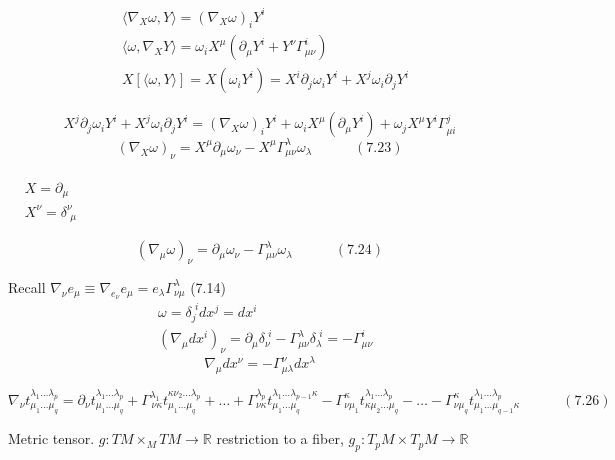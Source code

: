 \documentclass[twoside]{amsart}
\begin{document}
\[
\begin{aligned}
  & \langle \nabla_X \omega, Y \rangle = (\nabla_X \omega)_i Y^i \\ 
  & \langle \omega, \nabla_X Y \rangle = \omega_i X^{\mu} ( \partial_{\mu} Y^i + Y^{\nu} \Gamma^i_{\mu \nu } ) \\
  & X[ \langle \omega , Y \rangle ] = X(\omega_i Y^i ) = X^i \partial_j \omega_i Y^i + X^j \omega_i \partial_j Y^i 
\end{aligned}
\]

\[
X^j \partial_j \omega_i Y^i + X^j \omega_i \partial_j Y^i = (\nabla_X \omega)_i Y^i + \omega_i X^{\mu} ( \partial_{\mu} Y^i ) + \omega_j X^{\mu} Y^i \Gamma^j_{ \mu i }
\]
\[
(\nabla_X \omega)_{\nu} = X^{\mu} \partial_{\mu} \omega_{\nu} - X^{\mu} \Gamma^{\lambda}_{ \mu \nu} \omega_{\lambda} \quad \quad \quad (7.23)
\]

$\begin{aligned} & \quad \\ & X = \partial_{\mu} \\ & X^{\nu} = \delta^{\nu}_{ \, \, \mu } \end{aligned}$  

\[
(\nabla_{\mu} \omega)_{\nu} = \partial_{\mu} \omega_{\nu} - \Gamma_{\mu \nu}^{ \lambda}\omega_{\lambda} \quad \quad \quad (7.24)
\]

Recall $\nabla_{\nu} e_{\mu} \equiv \nabla_{e_{\nu}} e_{\mu} = e_{\lambda} \Gamma^{\lambda}_{\nu \mu} $ \quad \quad (7.14)
\[
\begin{aligned}
  & \omega = \delta_j^{ \, \, i } dx^j = dx^i \\ 
  & (\nabla_{\mu} dx^i )_{\nu} = \partial_{\mu} \delta_{\nu}^{ \, \, i } - \Gamma^{\lambda}_{\mu \nu} \delta_{\lambda}^{ \, \, i} = - \Gamma^i_{\mu \nu}
\end{aligned}
\]
\[
\nabla_{\mu} dx^{\nu} = - \Gamma^{\nu}_{\mu \lambda} dx^{\lambda}
\]

\[
\nabla_{\nu} t^{\lambda_1 \dots \lambda_p }_{ \mu_1 \dots \mu_q} = \partial_{\nu} t^{\lambda_1 \dots \lambda_p}_{ \mu_1 \dots \mu_q} + \Gamma^{\lambda_1}_{ \, \nu \kappa } t^{\kappa \nu_2 \dots \lambda_p }_{\mu_1 \dots \mu_q} + \dots + \Gamma^{\lambda_p}_{ \nu \kappa} t^{\lambda_1 \dots \lambda_{p-1} \kappa }_{ \mu_1 \dots \mu_q} - \Gamma^{\kappa}_{ \nu \mu_1} t^{\lambda_1 \dots \lambda_p }_{ \kappa \mu_2 \dots \mu_q} - \dots - \Gamma^{\kappa}_{ \nu \mu_q} t^{\lambda_1 \dots \lambda_p }_{\mu_1 \dots \mu_{q-1} \kappa } \quad \quad \quad (7.26)
\]

Metric tensor.  $g:TM \times_M TM \to \mathbb{R}$ restriction to a fiber, $g_p : T_p M \times T_pM \to \mathbb{R}$
\end{document}
